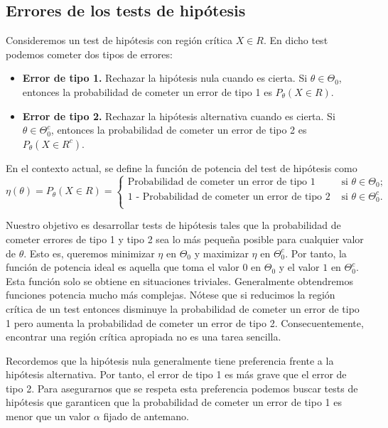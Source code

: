     \subsection{Errores de los tests de hipótesis}


        Consideremos un test de hipótesis con región crítica $X \in R$. En dicho test podemos cometer dos tipos de errores:

        \begin{itemize}
            \item \textbf{Error de tipo 1.} Rechazar la hipótesis nula cuando es cierta. Si $\theta \in \Theta_0$, entonces la probabilidad de cometer un error de tipo 1 es $P_\theta(X \in R)$.
            \item \textbf{Error de tipo 2.} Rechazar la hipótesis alternativa cuando es cierta. Si $\theta \in \Theta_0^c$, entonces la probabilidad de cometer un error de tipo 2 es $P_\theta(X \in R^c)$.
        \end{itemize}

        \begin{definition}
            En el contexto actual, se define la función de potencia del test de hipótesis como
            \[\eta(\theta) = P_\theta(X \in R) = \begin{cases} \text{Probabilidad de cometer un error de tipo 1} & \text{ si } \theta \in \Theta_0; \\ \text{1 - Probabilidad de cometer un error de tipo 2} & \text{ si } \theta \in \Theta_0^c. \\ \end{cases}\]
        \end{definition}

        Nuestro objetivo es desarrollar tests de hipótesis tales que la probabilidad de cometer errores de tipo 1 y tipo 2 sea lo más pequeña posible para cualquier valor de $\theta$. Esto es, queremos minimizar $\eta$ en $\Theta_0$ y maximizar $\eta$ en $\Theta_0^c$. Por tanto, la función de potencia ideal es aquella que toma el valor $0$ en $\Theta_0$ y el valor $1$ en $\Theta_0^c$. Esta función solo se obtiene en situaciones triviales. Generalmente obtendremos funciones potencia mucho más complejas. Nótese que si reducimos la región crítica de un test entonces disminuye la probabilidad de cometer un error de tipo 1 pero aumenta la probabilidad de cometer un error de tipo 2. Consecuentemente, encontrar una región crítica apropiada no es una tarea sencilla.

        Recordemos que la hipótesis nula generalmente tiene preferencia frente a la hipótesis alternativa. Por tanto, el error de tipo 1 es más grave que el error de tipo 2. Para asegurarnos que se respeta esta preferencia podemos buscar tests de hipótesis que garanticen que la probabilidad de cometer un error de tipo 1 es menor que un valor $\alpha$ fijado de antemano.

